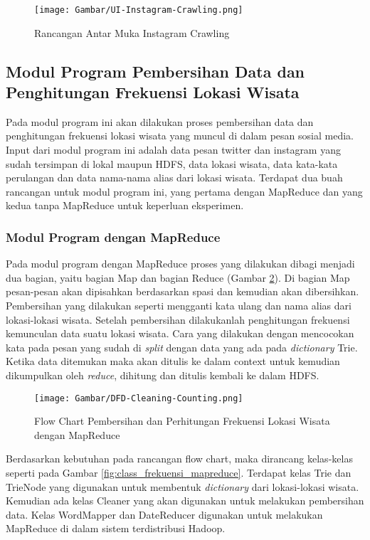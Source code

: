 \begin{figure}[H]
	\centering
	\texttt{[image: Gambar/UI-Instagram-Crawling.png]}
	\caption[Rancangan Antar Muka Instagram Crawling]{Rancangan Antar Muka Instagram Crawling} 
	\label{fig:ui_instagram_crawling}
\end{figure}


\subsection{Modul Program Pembersihan Data dan Penghitungan Frekuensi Lokasi Wisata}
Pada modul program ini akan dilakukan proses pembersihan data dan penghitungan frekuensi lokasi wisata yang muncul di dalam pesan sosial media. Input dari modul program ini adalah data pesan twitter dan instagram yang sudah tersimpan di lokal maupun HDFS, data lokasi wisata, data kata-kata perulangan dan data nama-nama alias dari lokasi wisata. Terdapat dua buah rancangan untuk modul program ini, yang pertama dengan MapReduce dan yang kedua tanpa MapReduce untuk keperluan eksperimen.

\subsubsection{Modul Program dengan MapReduce}
Pada modul program dengan MapReduce proses yang dilakukan dibagi menjadi dua bagian, yaitu bagian Map dan bagian Reduce (Gambar \ref{fig:flow_frekuensi_mapreduce}). Di bagian Map pesan-pesan akan dipisahkan berdasarkan spasi dan kemudian akan dibersihkan. Pembersihan yang dilakukan seperti mengganti kata ulang dan nama alias dari lokasi-lokasi wisata. Setelah pembersihan dilakukanlah penghitungan frekuensi kemunculan data suatu lokasi wisata. Cara yang dilakukan dengan mencocokan kata pada pesan yang sudah di \textit{split} dengan data yang ada pada \textit{dictionary} Trie. Ketika data ditemukan maka akan ditulis ke dalam context untuk kemudian dikumpulkan oleh \textit{reduce}, dihitung dan ditulis kembali ke dalam HDFS. 

\begin{figure}[H]
	\centering
	\texttt{[image: Gambar/DFD-Cleaning-Counting.png]}
	\caption[Flow Chart Pembersihan dan Perhitungan Frekuensi Lokasi Wisata dengan MapReduce]{Flow Chart Pembersihan dan Perhitungan Frekuensi Lokasi Wisata dengan MapReduce} 
	\label{fig:flow_frekuensi_mapreduce}
\end{figure}

Berdasarkan kebutuhan pada rancangan flow chart, maka dirancang kelas-kelas seperti pada Gambar \ref{fig:class_frekuensi_mapreduce}. Terdapat kelas Trie dan TrieNode yang digunakan untuk membentuk \textit{dictionary} dari lokasi-lokasi wisata. Kemudian ada kelas Cleaner yang akan digunakan untuk melakukan pembersihan data. Kelas WordMapper dan DateReducer digunakan untuk melakukan MapReduce di dalam sistem terdistribusi Hadoop.

